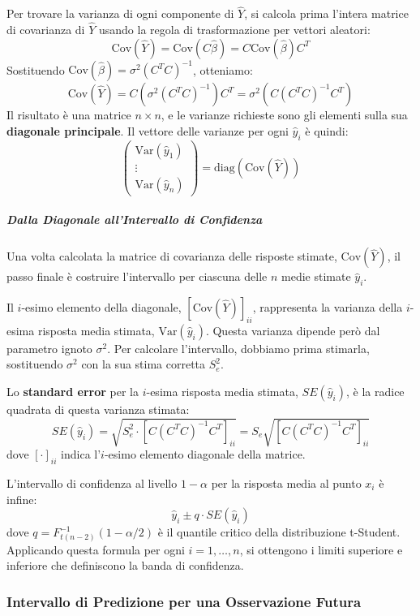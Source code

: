 Per trovare la varianza di ogni componente di \(\hat{Y}\), si calcola prima l'intera matrice di covarianza di \(\hat{Y}\) usando la regola di trasformazione per vettori aleatori:
\[
    \text{Cov}(\hat{Y}) = \text{Cov}(C \hat{\beta}) = C \text{Cov}(\hat{\beta}) C^T
\]
Sostituendo \(\text{Cov}(\hat{\beta}) = \sigma^2 (C^T C)^{-1}\), otteniamo:
\[
    \text{Cov}(\hat{Y}) = C \left( \sigma^2 (C^T C)^{-1} \right) C^T = \sigma^2 \left( C (C^T C)^{-1} C^T \right)
\]
Il risultato è una matrice \(n \times n\), e le varianze richieste sono gli elementi sulla sua \textbf{diagonale principale}. Il vettore delle varianze per ogni \(\hat{y}_i\) è quindi:
\[
    \begin{pmatrix} \text{Var}(\hat{y}_1) \\ \vdots \\ \text{Var}(\hat{y}_n) \end{pmatrix} = \text{diag}\left( \text{Cov}(\hat{Y}) \right)
\]

\subparagraph{Dalla Diagonale all'Intervallo di Confidenza}
Una volta calcolata la matrice di covarianza delle risposte stimate, \(\text{Cov}(\hat{Y})\), il passo finale è costruire l'intervallo per ciascuna delle \(n\) medie stimate \(\hat{y}_i\).

Il \(i\)-esimo elemento della diagonale, \([\text{Cov}(\hat{Y})]_{ii}\), rappresenta la varianza della \(i\)-esima risposta media stimata, \(\text{Var}(\hat{y}_i)\). Questa varianza dipende però dal parametro ignoto \(\sigma^2\). Per calcolare l'intervallo, dobbiamo prima stimarla, sostituendo \(\sigma^2\) con la sua stima corretta \(S_e^2\).

Lo \textbf{standard error} per la \(i\)-esima risposta media stimata, \(SE(\hat{y}_i)\), è la radice quadrata di questa varianza stimata:
\[
    SE(\hat{y}_i) = \sqrt{S_e^2 \cdot \left[ C (C^T C)^{-1} C^T \right]_{ii}} = S_e \sqrt{\left[ C (C^T C)^{-1} C^T \right]_{ii}}
\]
dove \([ \cdot ]_{ii}\) indica l'\(i\)-esimo elemento diagonale della matrice.

L'intervallo di confidenza al livello \(1-\alpha\) per la risposta media al punto \(x_i\) è infine:
\[
    \hat{y}_i \pm q \cdot SE(\hat{y}_i)
\]
dove \(q = F_{t(n-2)}^{-1}(1-\alpha/2)\) è il quantile critico della distribuzione t-Student. Applicando questa formula per ogni \(i=1, \dots, n\), si ottengono i limiti superiore e inferiore che definiscono la banda di confidenza.

\subsubsection{Intervallo di Predizione per una Osservazione Futura}

